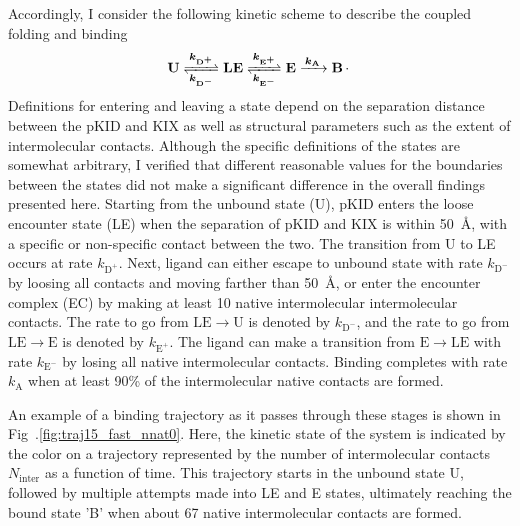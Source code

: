 \documentclass[../talant.diss.submit.tex]{subfiles}
\begin{document}
Accordingly,
I consider the following kinetic scheme to describe the coupled folding and binding
\begin{equation}
  \label{eq:kinetic_equation}
  \ce{
    \mbox{\textbf{U}} <=>[$\bm{k_{\mathrm{D}^{+}}}$][$\bm{k_{\mathrm{D}^{-}}}$] \mbox{\textbf{LE}}
    <=>[$\bm{k_{\mathrm{E}^{+}}}$][$\bm{k_{\mathrm{E}^{-}}}$] \mbox{\textbf{E}}
    ->[$\bm{k_{\mathrm{A}}}$] \mbox{\textbf{B}}.
  }
\end{equation}
%
%
Definitions for entering and leaving a state depend on the separation distance
between the pKID and KIX as well as structural parameters such as the extent of
intermolecular contacts. Although the specific definitions of the states are
somewhat arbitrary, I verified that different reasonable values for the
boundaries between the states did not make a significant difference in the
overall findings presented here. Starting from the unbound state (U), pKID enters
the loose encounter state (LE)
when the separation of pKID and KIX is within 50~\AA, with a specific or
non-specific contact between the two. The transition from U to LE occurs at rate
$k_{\mathrm{D}^+}$.  Next, ligand can either escape to unbound state with rate
$k_{\mathrm{D}^-}$ by loosing all contacts and moving farther than 50~\AA, or
enter the encounter complex (EC) by making at least 10 native intermolecular
intermolecular contacts. The rate to go from $\mathrm{LE\rightarrow U}$ is denoted by
$k_{\mathrm{D}^-}$, and the rate to go from $\mathrm{LE \rightarrow E}$ is denoted
by $k_{\mathrm{E}^+}$. The ligand can make a transition from $\mathrm{E \rightarrow LE}$
with rate $k_\mathrm{E^-}$ by losing all native intermolecular contacts. Binding
completes  with rate $k_\mathrm{A}$ when at least 90\% of the intermolecular native
contacts are formed.


An example of a binding trajectory as it passes through these stages is shown in
Fig~.\ref{fig:traj15_fast_nnat0}. Here, the kinetic state of the system is indicated
by the color on a trajectory represented by the number of intermolecular contacts
$N_{\mathrm{inter}}$ as a function of time.
This trajectory starts in the unbound state U, followed by multiple attempts made
into LE and E states, ultimately reaching the bound state 'B' when about
67 native intermolecular contacts are formed. 
\end{document}
